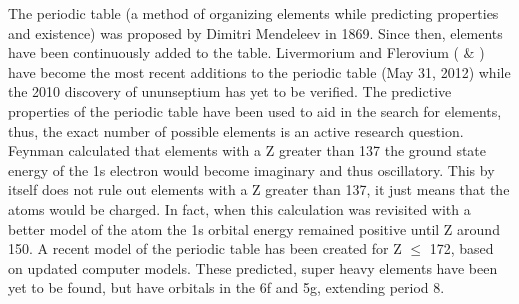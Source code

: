 \documentclass[11pt]{article}
\begin{document}
The periodic table (a method of organizing elements while predicting properties and existence) was proposed by Dimitri Mendeleev in 1869. 
Since then, elements have been continuously added to the table.
Livermorium and Flerovium ( \& ) have become the most recent additions to the periodic table (May 31, 2012) while the 2010 discovery of ununseptium has yet to be verified.
The predictive properties of the periodic table have been used to aid in the search for elements, thus, the exact number of possible elements is an active research question.
Feynman calculated that elements with a Z greater than 137 the ground state energy of the 1s electron would become imaginary and thus oscillatory. This by itself does not rule out elements with a Z greater than 137, it just means that the atoms would be charged. 
In fact, when this calculation was revisited with a better model of the atom the 1s orbital energy remained positive until Z around 150.
A recent model of the periodic table has been created for Z $\le$ 172, based on updated computer models. These predicted, super heavy elements have been yet to be found, but have orbitals in the 6f and 5g, extending period 8.
\end{document}
